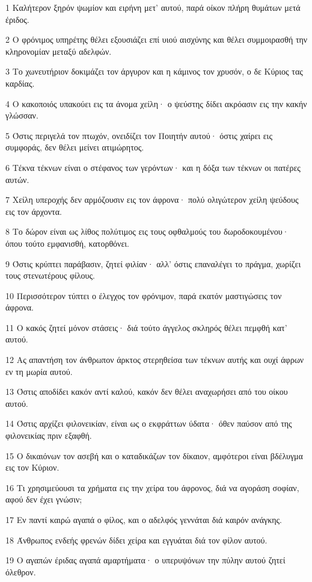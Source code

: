 \par 1 Καλήτερον ξηρόν ψωμίον και ειρήνη μετ' αυτού, παρά οίκον πλήρη θυμάτων μετά έριδος.
\par 2 Ο φρόνιμος υπηρέτης θέλει εξουσιάζει επί υιού αισχύνης και θέλει συμμοιρασθή την κληρονομίαν μεταξύ αδελφών.
\par 3 Το χωνευτήριον δοκιμάζει τον άργυρον και η κάμινος τον χρυσόν, ο δε Κύριος τας καρδίας.
\par 4 Ο κακοποιός υπακούει εις τα άνομα χείλη· ο ψεύστης δίδει ακρόασιν εις την κακήν γλώσσαν.
\par 5 Όστις περιγελά τον πτωχόν, ονειδίζει τον Ποιητήν αυτού· όστις χαίρει εις συμφοράς, δεν θέλει μείνει ατιμώρητος.
\par 6 Τέκνα τέκνων είναι ο στέφανος των γερόντων· και η δόξα των τέκνων οι πατέρες αυτών.
\par 7 Χείλη υπεροχής δεν αρμόζουσιν εις τον άφρονα· πολύ ολιγώτερον χείλη ψεύδους εις τον άρχοντα.
\par 8 Το δώρον είναι ως λίθος πολύτιμος εις τους οφθαλμούς του δωροδοκουμένου· όπου τούτο εμφανισθή, κατορθόνει.
\par 9 Όστις κρύπτει παράβασιν, ζητεί φιλίαν· αλλ' όστις επαναλέγει το πράγμα, χωρίζει τους στενωτέρους φίλους.
\par 10 Περισσότερον τύπτει ο έλεγχος τον φρόνιμον, παρά εκατόν μαστιγώσεις τον άφρονα.
\par 11 Ο κακός ζητεί μόνον στάσεις· διά τούτο άγγελος σκληρός θέλει πεμφθή κατ' αυτού.
\par 12 Ας απαντήση τον άνθρωπον άρκτος στερηθείσα των τέκνων αυτής και ουχί άφρων εν τη μωρία αυτού.
\par 13 Όστις αποδίδει κακόν αντί καλού, κακόν δεν θέλει αναχωρήσει από του οίκου αυτού.
\par 14 Όστις αρχίζει φιλονεικίαν, είναι ως ο εκφράττων ύδατα· όθεν παύσον από της φιλονεικίας πριν εξαφθή.
\par 15 Ο δικαιόνων τον ασεβή και ο καταδικάζων τον δίκαιον, αμφότεροι είναι βδέλυγμα εις τον Κύριον.
\par 16 Τι χρησιμεύουσι τα χρήματα εις την χείρα του άφρονος, διά να αγοράση σοφίαν, αφού δεν έχει γνώσιν;
\par 17 Εν παντί καιρώ αγαπά ο φίλος, και ο αδελφός γεννάται διά καιρόν ανάγκης.
\par 18 Άνθρωπος ενδεής φρενών δίδει χείρα και εγγυάται διά τον φίλον αυτού.
\par 19 Ο αγαπών έριδας αγαπά αμαρτήματα· ο υπερυψόνων την πύλην αυτού ζητεί όλεθρον.
